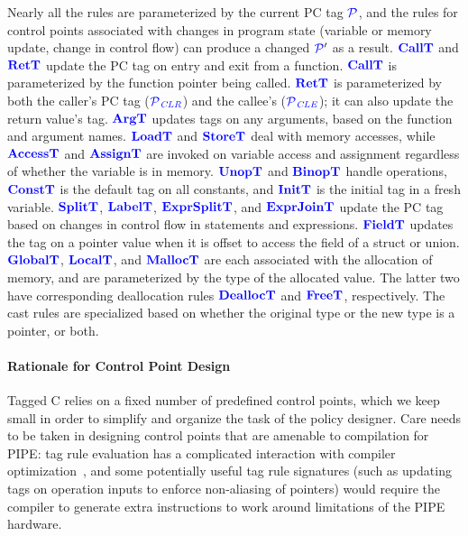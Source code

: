 \documentclass{llncs}
\begin{document}
Nearly all the rules are parameterized by the current PC tag \(\PCT\), and the rules
for control points associated with changes in program state (variable or memory update,
change in control flow) can produce a changed \(\PCT'\) as a result.
\(\calltname\)
and \(\rettname\) update the PC tag on entry and exit from a function.
\(\calltname\) is parameterized by the function pointer being called.
\(\rettname\) is parameterized by both the caller's PC tag (\(\PCT[_{\color{blue} CLR}]\))
and the callee's (\(\PCT[_{\color{blue} CLE}]\)); it can also update the return value's tag.
\(\argtname\) updates tags on any arguments, based on the function and argument names.
\(\loadtname\) and \(\storetname\) deal with memory accesses, while \(\accesstname\) and
\(\assigntname\) are invoked on variable access and assignment regardless of whether the variable
is in memory.
\(\unoptname\) and \(\binoptname\) handle operations, \(\consttname\) is the default tag
on all constants, and \(\inittname\) is the initial tag in a fresh variable.
\(\splittname\), \(\labeltname\), \(\exprsplittname\), and \(\exprjointname\) 
update the PC tag based on changes in control flow in statements and expressions.
\(\fieldtname\) updates the tag on a pointer value when it is offset to access the field
of a struct or union. \(\globaltname\), \(\localtname\),
and \(\malloctname\) are each associated with the allocation of memory, and are
parameterized by the type of the allocated value. The latter
two have corresponding deallocation rules \(\dealloctname\) and \(\freetname\),
respectively. The cast rules are specialized based on whether the original type or
the new type is a pointer, or both.

\paragraph{Rationale for Control Point Design}

Tagged C relies on a fixed number of predefined control points, which we keep small
in order to simplify and organize the task of the policy designer.
Care needs to be taken in designing control points that are amenable
to compilation for PIPE: tag rule evaluation has a complicated interaction with
compiler optimization~\cite{Chhak21:Tagine}, and some potentially useful tag
rule signatures (such as updating tags on operation inputs to enforce non-aliasing of pointers)
would require the compiler to generate extra instructions to work
around limitations of the PIPE hardware.
\end{document}
